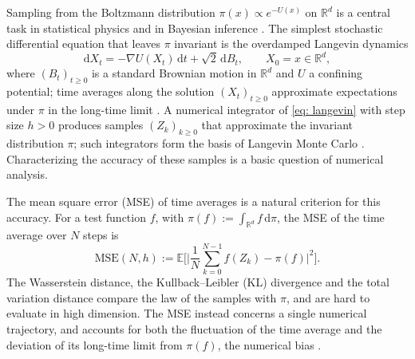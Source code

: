 \documentclass{article}
\newcommand{\Ge}{\geqslant}
\newcommand{\D}{\mathrm{d}}
\newcommand{\MSE}{\mathrm{MSE}}
\numberwithin{equation}{section}
\begin{document}
Sampling from the Boltzmann distribution $\pi(x) \propto e^{-U(x)}$ on $\mathbb R^d$ is a central task in statistical physics \citep{lelievre2016partial, leimkuhler2015molecular} and in Bayesian inference \citep{welling2011bayesian, dalalyan2017user, durmus2017nonasymptotic}. The simplest stochastic differential equation that leaves $\pi$ invariant is the overdamped Langevin dynamics
\begin{equation}
    \D X_t = -\nabla U(X_t)\,\D t + \sqrt2\,\D B_t , \qquad X_0 = x \in \mathbb R^d ,
    \label{eq: langevin}
\end{equation}
where $(B_t)_{t \Ge 0}$ is a standard Brownian motion in $\mathbb R^d$ and $U$ a confining potential; time averages along the solution $(X_t)_{t \Ge 0}$ approximate expectations under $\pi$ in the long-time limit \citep{roberts1996exponential, lamberton2002recursive}. A numerical integrator of \eqref{eq: langevin} with step size $h > 0$ produces samples $(Z_k)_{k \Ge 0}$ that approximate the invariant distribution $\pi$; such integrators form the basis of Langevin Monte Carlo \citep{dalalyan2017user, durmus2017nonasymptotic, cheng2018sharp, durmus2019high, vempala2019rapid, majka2020nonasymptotic}. Characterizing the accuracy of these samples is a basic question of numerical analysis.

The mean square error (MSE) of time averages is a natural criterion for this accuracy. For a test function $f$, with $\pi(f) := \int_{\mathbb R^d} f\,\D\pi$, the MSE of the time average over $N$ steps is
\begin{equation}
    \MSE(N, h) := \mathbb E \Biggl[ \biggl| \frac1N \sum_{k=0}^{N-1} f(Z_k) - \pi(f) \biggr|^2 \Biggr] .
    \label{eq: mse}
\end{equation}
The Wasserstein distance, the Kullback--Leibler (KL) divergence and the total variation distance compare the law of the samples with $\pi$, and are hard to evaluate in high dimension. The MSE instead concerns a single numerical trajectory, and accounts for both the fluctuation of the time average and the deviation of its long-time limit from $\pi(f)$, the numerical bias \citep{mattingly2010convergence, chen2015convergence, teh2016consistency, vollmer2016exploration}.
\end{document}
